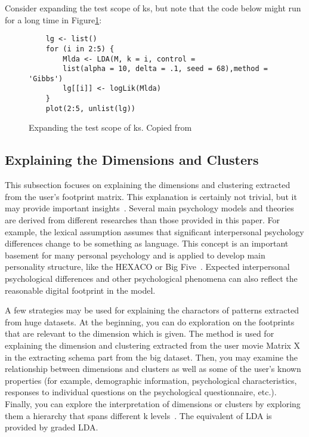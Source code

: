 Consider expanding the test scope of ks, but note that the code 
below might run for a long time in Figure\ref{F:expanding}:

\begin{figure}[htb]
\begin{footnotesize}
\begin{verbatim}
    lg <- list()
    for (i in 2:5) {
        Mlda <- LDA(M, k = i, control =
        list(alpha = 10, delta = .1, seed = 68),method = 'Gibbs')
        lg[[i]] <- logLik(Mlda)
    }
    plot(2:5, unlist(lg))
\end{verbatim}
\end{footnotesize}
\caption{Expanding the test scope of ks. Copied from~\cite{hid515-12}}
\label{F:expanding}
\end{figure}


\subsection{Explaining the Dimensions and Clusters~\cite{hid515-12}}

This subsection focuses on explaining the dimensions and clustering
 extracted 
from the user's footprint matrix. This explanation is certainly not
 trivial, but it may provide important insights~\cite{hid515-12}. 
Several main
psychology models and theories are derived from different 
researches than those provided in this paper. For example, the 
lexical assumption assumes that significant interpersonal 
psychology differences change to be something as language. 
This concept
 is an important basement for many personal psychology and is
 applied to develop main personality structure, like the HEXACO or Big
 Five~\cite{hid515-12}. 
Expected interpersonal psychological differences and other 
psychological phenomena can also reflect the reasonable digital 
footprint in the model.

A few strategies may be used for explaining the charactors of 
patterns extracted from huge datasets. At the beginning, 
you can do exploration on the 
footprints that are relevant to the dimension which is given.
 The method is used for explaining the dimension and clustering 
extracted from the user movie Matrix X in the extracting schema 
part from the big dataset. 
Then, you may examine the 
relationship between dimensions and clusters as well as some of 
the user's known properties (for example, demographic information,
 psychological characteristics, responses to individual questions 
on the psychological questionnaire, etc.). Finally, you can 
explore the interpretation of dimensions or clusters by exploring 
them a hierarchy that spans different k levels~\cite{hid515-12}. 
The equivalent of LDA is provided by graded LDA.

